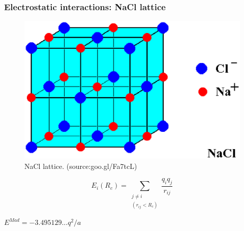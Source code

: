 \documentclass{beamer}
\begin{document}
\begin{frame}\frametitle{Electrostatic interactions: NaCl lattice}

\fboxsep=0pt
\noindent %
\begin{minipage}[t]{0.48\linewidth}
\begin{figure}
\includegraphics[scale=0.19]{nacl_complex_motif_2.eps}
\caption{{\scriptsize  NaCl lattice. (source:goo.gl/Fa7tcL) }}
\end{figure}
\begin{equation}
        E_i(R_c) = \sum_{\substack{j \neq i \\ (r_{ij}<R_c)}} \frac{q_i q_j}{r_{ij}} 
\end{equation}

$	E^{Mad} = -3.495129 ... q^2/a$



\end{minipage}
\end{frame}
\end{document}
